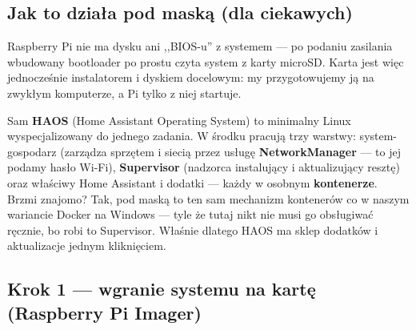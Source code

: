 \documentclass[11pt,a4paper]{article}
\begin{document}
\subsection{Jak to działa pod maską (dla ciekawych)}

Raspberry Pi nie ma dysku ani ,,BIOS-u'' z systemem --- po podaniu zasilania wbudowany bootloader po prostu czyta system z karty microSD. Karta jest więc jednocześnie instalatorem i dyskiem docelowym: my przygotowujemy ją na zwykłym komputerze, a Pi tylko z niej startuje.

Sam \textbf{HAOS} (Home Assistant Operating System) to minimalny Linux wyspecjalizowany do jednego zadania. W środku pracują trzy warstwy: system-gospodarz (zarządza sprzętem i siecią przez usługę \textbf{NetworkManager} --- to jej podamy hasło Wi-Fi), \textbf{Supervisor} (nadzorca instalujący i aktualizujący resztę) oraz właściwy Home Assistant i dodatki --- każdy w osobnym \textbf{kontenerze}. Brzmi znajomo? Tak, pod maską to ten sam mechanizm kontenerów co w naszym wariancie Docker na Windows --- tyle że tutaj nikt nie musi go obsługiwać ręcznie, bo robi to Supervisor. Właśnie dlatego HAOS ma sklep dodatków i aktualizacje jednym kliknięciem.

\subsection{Krok 1 --- wgranie systemu na kartę (Raspberry Pi Imager)}
\end{document}

